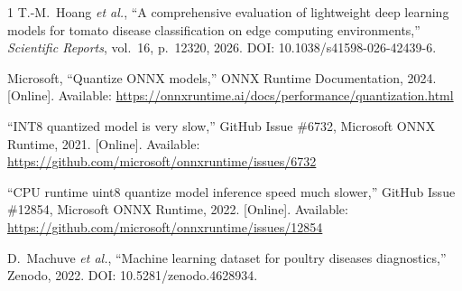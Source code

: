\documentclass[conference,a4paper]{IEEEtran}
\begin{document}
\begin{thebibliography}{1}
T.-M.~Hoang \textit{et al.}, ``A comprehensive evaluation of lightweight deep learning models for tomato disease classification on edge computing environments,'' \emph{Scientific Reports}, vol.~16, p.~12320, 2026. DOI: 10.1038/s41598-026-42439-6.

Microsoft, ``Quantize ONNX models,'' ONNX Runtime Documentation, 2024. [Online]. Available: \url{https://onnxruntime.ai/docs/performance/quantization.html}

``INT8 quantized model is very slow,'' GitHub Issue \#6732, Microsoft ONNX Runtime, 2021. [Online]. Available: \url{https://github.com/microsoft/onnxruntime/issues/6732}

``CPU runtime uint8 quantize model inference speed much slower,'' GitHub Issue \#12854, Microsoft ONNX Runtime, 2022. [Online]. Available: \url{https://github.com/microsoft/onnxruntime/issues/12854}

D.~Machuve \textit{et al.}, ``Machine learning dataset for poultry diseases diagnostics,'' Zenodo, 2022. DOI: 10.5281/zenodo.4628934.

\end{thebibliography}
\end{document}
